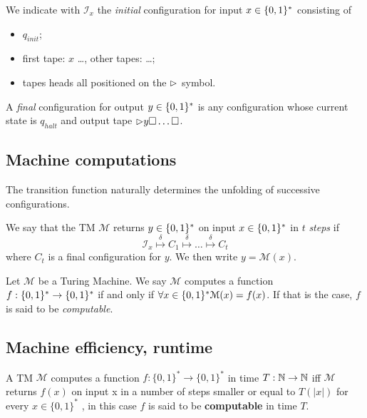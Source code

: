\begin{definition}
	We indicate with $\mathcal{I}_x$ the \emph{initial} configuration for input $x \in \{ 0,1 \}^* $ consisting of
	\begin{itemize}
		\item $q_{init}$;
		\item first tape: \start $x$ \blank \ldots \blank , other tapes: \start \blank \ldots \blank ;
		\item tapes heads all positioned on the $\rhd$ symbol.
	\end{itemize}
	A \emph{final} configuration for output $y \in \{ 0,1 \}^* $ is any configuration whose current state is $q_{halt}$ and output tape $\rhd y \square \dots \square$.
\end{definition}


\subsection{Machine computations}

The transition function naturally determines the unfolding of successive configurations.
\begin{definition}
	We say that the TM $\mathcal{M}$ returns $y \in \{ 0,1 \}^* $ on input $x \in \{ 0,1 \}^* $ in $t$ \emph{steps} if
	\[
		\mathcal{I}_x \overset{\delta}{\mapsto} C_1 \overset{\delta}{\mapsto} \dots \overset{\delta}{\mapsto} C_t
	\]
	where $C_t$ is a final configuration for $y$. We then write $y = \mathcal{M}(x)$.
\end{definition}
\begin{definition}
	Let $\mathcal{M}$ be a Turing Machine. We say $\mathcal{M}$ computes a function $f: \{ 0,1 \}^*  \to \{ 0,1 \}^* $ if and only if $\forall x \in \{ 0,1 \}^*  \mathcal{M}(x) = f(x)$. If that is the case, $f$ is said to be \emph{computable}.
	\label{def:computable-function}
\end{definition}

\subsection{Machine efficiency, runtime}

\begin{definition}
	A TM \(\mathcal{M}\) computes a function \(f:\{0,1\}^* \rightarrow \{0,1\}^*\) in time \(T : \mathbb{N} \to \mathbb{N}\) iff \(\mathcal{M}\) returns $f(x)$ on input x in a number of steps smaller or equal to \(T(|x|)\) for every \(x \in \{0,1\}^*\) , in this case $f$ is said to be \textbf{computable} in time $T$.
	\label{def:function-runinng-time}
\end{definition}

